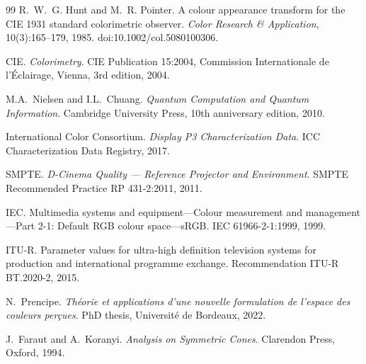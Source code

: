 \documentclass[11pt]{article}
\theoremstyle{plain}
\theoremstyle{definition}
\theoremstyle{remark}
\begin{document}
\begin{thebibliography}{99}
R.~W.~G. Hunt and M.~R. Pointer.
\newblock A colour appearance transform for the CIE 1931 standard colorimetric observer.
\newblock \emph{Color Research \& Application}, 10(3):165--179, 1985.
\newblock doi:10.1002/col.5080100306.

{CIE}. \emph{Colorimetry}. CIE Publication 15:2004, Commission Internationale de l'\'Eclairage, Vienna, 3rd edition, 2004.

M.A.~Nielsen and I.L.~Chuang. \emph{Quantum Computation and Quantum Information}. Cambridge University Press, 10th anniversary edition, 2010.

International Color Consortium.
\newblock \emph{Display {P3} Characterization Data}.
\newblock ICC Characterization Data Registry, 2017.

{SMPTE}. \emph{{D-Cinema} Quality --- Reference Projector and Environment}. SMPTE Recommended Practice RP 431-2:2011, 2011.

{IEC}. Multimedia systems and equipment---Colour measurement and management---Part 2-1: Default {RGB} colour space---{sRGB}. {IEC} 61966-2-1:1999, 1999.

{ITU-R}. Parameter values for ultra-high definition television systems for production and international programme exchange. Recommendation {ITU-R} {BT}.2020-2, 2015.

N.~Prencipe.
\newblock \emph{Th\'eorie et applications d'une nouvelle formulation de l'espace des couleurs per\c{c}ues}.
\newblock PhD thesis, Universit\'e de Bordeaux, 2022.

J.~Faraut and A.~Koranyi.
\newblock \emph{Analysis on Symmetric Cones}.
\newblock Clarendon Press, Oxford, 1994.

\end{thebibliography}
\end{document}
